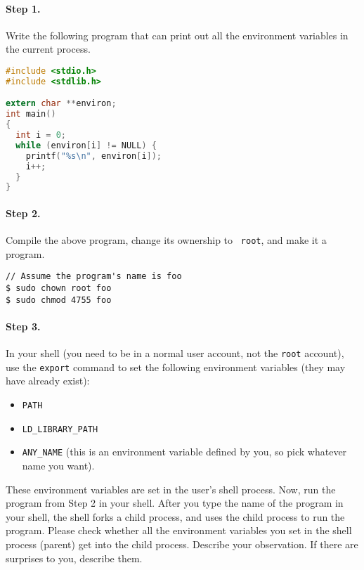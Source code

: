 \paragraph{Step 1.} Write the following program that can print out all
the environment variables in the current process.

\begin{lstlisting}[language=C]
#include <stdio.h>
#include <stdlib.h>

extern char **environ;
int main()
{
  int i = 0;
  while (environ[i] != NULL) {
    printf("%s\n", environ[i]);
    i++;
  }
}
\end{lstlisting}


\paragraph{Step 2.} Compile the above program, change its ownership to {\tt
root}, and make it a \setuid program.

\begin{lstlisting}
// Assume the program's name is foo
$ sudo chown root foo
$ sudo chmod 4755 foo
\end{lstlisting}



\paragraph{Step 3.} In your shell (you need to be in a normal user account,
not the {\tt root} account), use the {\tt export} command to set the
following environment variables (they may have already exist):

\begin{itemize}[noitemsep]
\item {\tt PATH}
\item {\tt LD\_LIBRARY\_PATH}
\item {\tt ANY\_NAME} (this is an environment variable defined by you, so
pick whatever name you want).
\end{itemize}


These environment variables are set in the user's shell process.
Now, run the \setuid program from Step 2 in your shell. After you type the
name of the program in your shell, the shell forks a child process,
and uses the child process to run the program. Please check whether all the
environment variables you set in the shell process (parent) get into
the \setuid child process.  Describe your observation. If there are
surprises to you, describe them.



